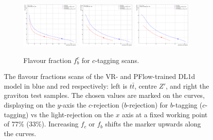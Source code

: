 \begin{figure}[h!]
  \begin{subfigure}[b]{\textwidth}
    \centering %
    \includegraphics[width=0.32\textwidth]{Images/FTAG/VRDL1d/scansfraction/thesis_plot_frac_c/contour_fraction_ttbar_2000.pdf}
    \includegraphics[width=0.32\textwidth]{Images/FTAG/VRDL1d/scansfraction/thesis_plot_frac_c/contour_fraction_zpext_2000.pdf}
    \includegraphics[width=0.32\textwidth]{Images/FTAG/VRDL1d/scansfraction/thesis_plot_frac_c/contour_fraction_graviton_2000.pdf}
    \caption{Flavour fraction $f_b^c$ for $c$-tagging scans.} 
    \label{fig:DL1dVRscanfc}
\end{subfigure}
  \caption{The flavour fractions scans of the VR- and PFlow-trained DL1d model in blue and red respectively: left is $t\bar{t}$, centre $Z'$, and right the graviton test samples. The chosen values are marked on the curves, displaying on the $y$-axis the $c$-rejection ($b$-rejection) for $b$-tagging ($c$-tagging) vs the light-rejection on the $x$ axis at a fixed working point of 77\% (33\%). Increasing $f_c$ or $f_b$ shifts the marker upwards along the curves. }
  \label{apfig:DL1dVRscanf}
\end{figure} 

